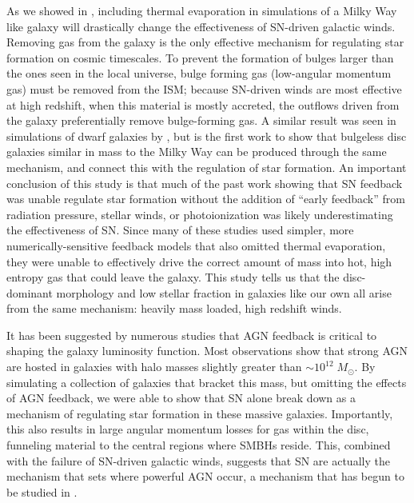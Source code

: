 As we showed in \citet{Keller2015}, including thermal evaporation in simulations
of a Milky Way like galaxy will drastically change the effectiveness of
SN-driven galactic winds.  Removing gas from the galaxy is the only effective
mechanism for regulating star formation on cosmic timescales.  To prevent the
formation of bulges larger than the ones seen in the local universe, bulge
forming gas (low-angular momentum gas) must be removed from the ISM; because
SN-driven winds are most effective at high redshift, when this material is
mostly accreted, the outflows driven from the galaxy preferentially remove
bulge-forming gas.  A similar result was seen in simulations of dwarf galaxies
by \citet{Governato2010, Brook2011}, but \citet{Keller2015} is the first work to
show that bulgeless disc galaxies similar in mass to the Milky Way can be
produced through the same mechanism, and connect this with the regulation of
star formation.  An important conclusion of this study is that much of the past
work \citet{Stinson2013,Agertz2013,Hopkins2014} showing that SN feedback was
unable regulate star formation without the addition of ``early feedback'' from
radiation pressure, stellar winds, or photoionization was likely underestimating
the effectiveness of SN.  Since many of these studies used simpler, more
numerically-sensitive feedback models that also omitted thermal evaporation,
they were unable to effectively drive the correct amount of mass into hot, high
entropy gas that could leave the galaxy.  This study tells us that the
disc-dominant morphology and low stellar fraction in galaxies like our own all
arise from the same mechanism:  heavily mass loaded, high redshift winds.

It has been suggested by numerous studies \citep{Benson2003,Bower2006} that AGN
feedback is critical to shaping the galaxy luminosity function.  Most
observations \citep{Kauffmann2003b} show that strong AGN are hosted in galaxies
with halo masses slightly greater than $\sim10^{12}\;M_\odot$.  By simulating a
collection of galaxies that bracket this mass, but omitting the effects of AGN
feedback, we were able to show that SN alone break down as a mechanism of
regulating star formation in these massive galaxies.  Importantly, this also
results in large angular momentum losses for gas within the disc, funneling
material to the central regions where SMBHs reside.  This, combined with the
failure of SN-driven galactic winds, suggests that SN are actually the mechanism
that sets where powerful AGN occur, a mechanism that has begun to be studied in
\citet{Bower2016}.

